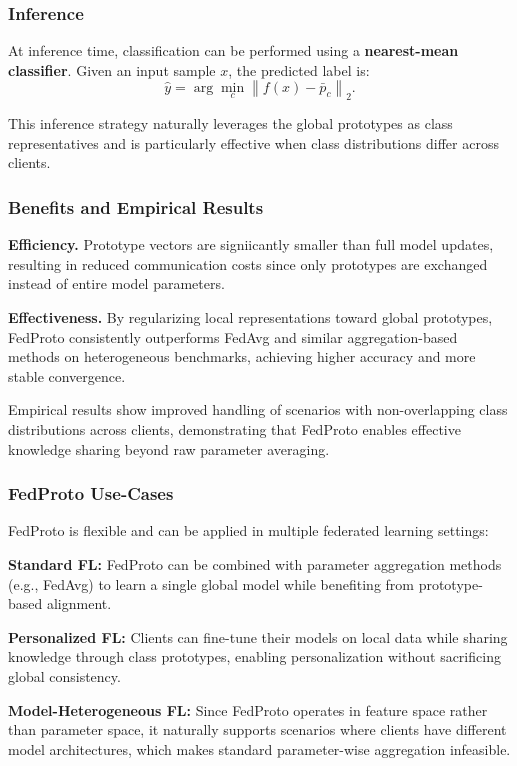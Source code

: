 \subsubsection{Inference}

At inference time, classification can be performed using a \textbf{nearest-mean
classifier}. Given an input sample $x$, the predicted label is:
\[
\hat{y}
=
\arg\min_c
\left\|
f(x) - \bar{p}_c
\right\|_2.
\]

This inference strategy naturally leverages the global prototypes as class representatives
and is particularly effective when class distributions differ across clients.

\subsubsection{Benefits and Empirical Results}

\textbf{Efficiency.}  
Prototype vectors are signiicantly smaller than full model updates, resulting in reduced
communication costs since only prototypes are exchanged instead of entire model
parameters.

\textbf{Effectiveness.}  
By regularizing local representations toward global prototypes, FedProto consistently
outperforms FedAvg and similar aggregation-based methods on heterogeneous benchmarks,
achieving higher accuracy and more stable convergence.

Empirical results show improved handling of scenarios with non-overlapping class
distributions across clients, demonstrating that FedProto enables effective knowledge
sharing beyond raw parameter averaging.

\subsubsection{FedProto Use-Cases}

FedProto is flexible and can be applied in multiple federated learning settings:

\begin{compactitemize}
    \item \textbf{Standard FL:}  
    FedProto can be combined with parameter aggregation methods (e.g., FedAvg) to learn
    a single global model while benefiting from prototype-based alignment.

    \item \textbf{Personalized FL:}  
    Clients can fine-tune their models on local data while sharing knowledge through class
    prototypes, enabling personalization without sacrificing global consistency.

    \item \textbf{Model-Heterogeneous FL:}  
    Since FedProto operates in feature space rather than parameter space, it naturally
    supports scenarios where clients have different model architectures, which makes
    standard parameter-wise aggregation infeasible.
\end{compactitemize}
